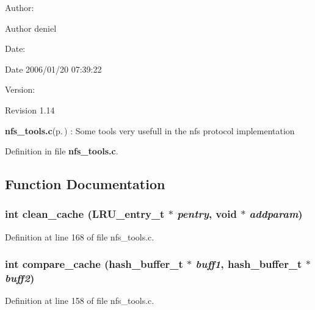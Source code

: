 \begin{Desc}
\item[Author:]\begin{Desc}
\item[Author]deniel \end{Desc}
\end{Desc}
\begin{Desc}
\item[Date:]\begin{Desc}
\item[Date]2006/01/20 07:39:22 \end{Desc}
\end{Desc}
\begin{Desc}
\item[Version:]\begin{Desc}
\item[Revision]1.14 \end{Desc}
\end{Desc}
{\bf nfs\_\-tools.c}{\rm (p.\,\pageref{nfs__tools_8c})} : Some tools very usefull in the nfs protocol implementation

Definition in file {\bf nfs\_\-tools.c}.

\subsection{Function Documentation}
\subsubsection{\setlength{\rightskip}{0pt plus 5cm}int clean\_\-cache (LRU\_\-entry\_\-t $\ast$ {\em pentry}, void $\ast$ {\em addparam})}\label{nfs__tools_8c_a5}




Definition at line 168 of file nfs\_\-tools.c.
\subsubsection{\setlength{\rightskip}{0pt plus 5cm}int compare\_\-cache (hash\_\-buffer\_\-t $\ast$ {\em buff1}, hash\_\-buffer\_\-t $\ast$ {\em buff2})}\label{nfs__tools_8c_a3}




Definition at line 158 of file nfs\_\-tools.c.
